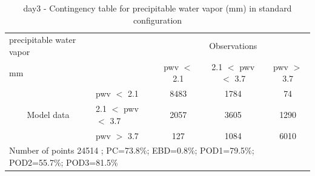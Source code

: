 \begin{table}[p!]
\begin{center}
\begin{tabular}{llccc}
\hline
{precipitable water vapor}                                       &                                                    & \multicolumn{3}{c}{Observations}                 \\
{mm}                                       &                             & pwv $<$ 2.1   & 2.1 $<$ pwv $<$ 3.7 & pwv $>$ 3.7 \\
\hline
\multicolumn{1}{c}{\multirow{3}{*}{Model data}}  & pwv $<$ 2.1             & 8483                & 1784                       & 74              \\
                                                 & 2.1  $<$ pwv $<$ 3.7 & 2057                & 3605                       & 1290              \\
                                                 & pwv $>$ 3.7             & 127                & 1084                       & 6010              \\
\hline
\multicolumn{5}{l}{ Number of points        24514 ; PC=73.8\%; EBD=0.8\%; POD1=79.5\%; POD2=55.7\%; POD3=81.5\%}                 \\
\end{tabular}
\end{center}
\caption{day3 - Contingency table for  precipitable water vapor (mm) in standard configuration  }
\label{tab:contingencypwvBEF:day3}
\end{table}
